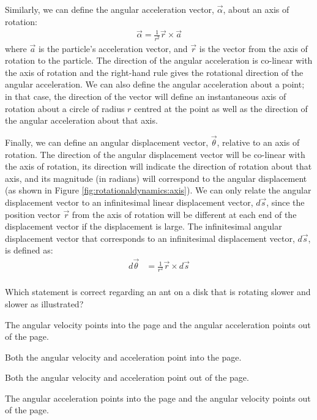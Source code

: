 Similarly, we can define the angular acceleration vector, $\vec \alpha$, about an axis of rotation:
\begin{align}
\vec \alpha = \frac{1}{r^2}\vec r \times \vec a
\end{align}
where $\vec a$ is the particle's acceleration vector,  and $\vec r$ is the vector from the axis of rotation to the particle. The direction of the angular acceleration is co-linear with the axis of rotation and the right-hand rule gives the rotational direction of the angular acceleration. We can also define the angular acceleration about a point; in that case, the direction of the vector will define an instantaneous axis of rotation about a circle of radius $r$ centred at the point as well as the direction of the angular acceleration about that axis.

Finally, we can define an angular displacement vector, $\vec \theta$, relative to an axis of rotation. The direction of the angular displacement vector will be co-linear with the axis of rotation, its direction will indicate the direction of rotation about that axis, and its magnitude (in radians) will correspond to the angular displacement (as shown in Figure \ref{fig:rotationaldynamics:axis}). We can only relate the angular displacement vector to an infinitesimal linear displacement vector, $d\vec s$, since the position vector $\vec r$ from the axis of rotation will be different at each end of the displacement vector if the displacement is large. The infinitesimal angular displacement vector that corresponds to an infinitesimal displacement vector, $d\vec s$, is defined as:
\begin{align*}
d\vec \theta &= \frac{1}{r^2} \vec r \times d\vec s\\
\end{align*}

\begin{checkpoint}
\begin{MCquestion}{Which statement is correct regarding an ant on a disk that is rotating slower and slower as illustrated?
}
\item The angular velocity points into the page and the angular acceleration points out of the page. 
\item Both the angular velocity and acceleration point into the page.
\item Both the angular velocity and acceleration point out of the page.
\item The angular acceleration points into the page and the angular velocity points out of the page. \correct
\end{MCquestion}
\end{checkpoint}

